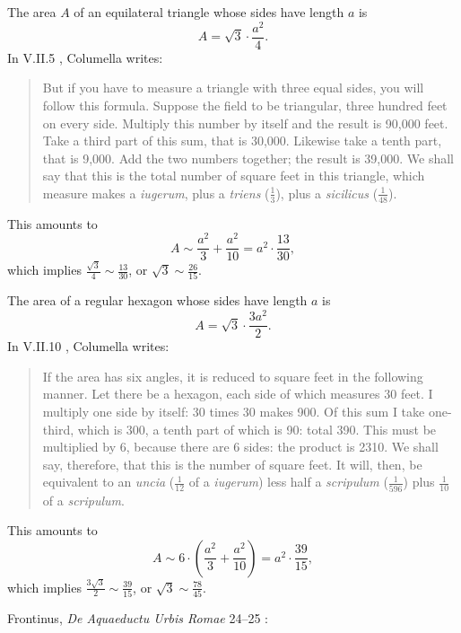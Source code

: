 The area $A$ of an equilateral triangle whose sides have length $a$ is
\[
A=\sqrt{3} \cdot \frac{a^2}{4}.
\]
In V.II.5 \cite[pp.~15--17]{columellaII}, Columella writes:

\begin{quote}
But if you have to measure a triangle with three equal sides, you will follow this formula. Suppose the field to be triangular, three hundred feet on every side. Multiply this number by itself and the result is 90,000 feet. Take a third part of this sum, that is
30,000. Likewise take a tenth part, that is 9,000. Add the two numbers together; the result is 39,000. We shall say that this is the total number of square feet in this triangle, which measure makes a {\em iugerum}, plus a {\em triens} ($\frac{1}{3}$), plus a {\em sicilicus} ($\frac{1}{48}$).
\end{quote}

This amounts to 
\[
A \sim \frac{a^2}{3}+\frac{a^2}{10} = a^2 \cdot \frac{13}{30},
\]
which implies $\frac{\sqrt{3}}{4} \sim \frac{13}{30}$, or $\sqrt{3} \sim \frac{26}{15}$. 

The area of a regular hexagon whose sides have length $a$ is
\[
A = \sqrt{3} \cdot \frac{3a^2}{2}.
\]
In V.II.10 \cite[pp.~21--23]{columellaII}, Columella writes:

\begin{quote}
If the area has six angles, it is reduced to square  feet in the following manner. Let there be a hexagon, each side of which measures 30 feet. I multiply one side by itself:
30 times 30 makes 900. Of this sum I take one-third, which is 300, a tenth part of which is 90: total 390. This must be multiplied
by 6, because there are 6 sides: the product is 2310. We shall say, therefore, that this is the number of square feet. It will, then, be equivalent to an {\em uncia}
($\frac{1}{12}$ of a {\em iugerum}) less half a {\em scripulum} ($\frac{1}{596}$) plus $\frac{1}{10}$ of a {\em scripulum}.
\end{quote}

This amounts to
\[
A \sim 6 \cdot \left( \frac{a^2}{3}+\frac{a^2}{10} \right) = a^2 \cdot \frac{39}{15},
\]
which implies $\frac{3\sqrt{3}}{2} \sim  \frac{39}{15}$, or $\sqrt{3} \sim \frac{78}{45}$. 

Frontinus, {\em De Aquaeductu Urbis Romae} 24--25 \cite{rodgers}:

